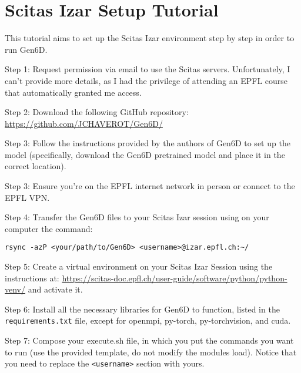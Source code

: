 \chapter{Scitas Izar Setup Tutorial}\label{chapter:scitas}

This tutorial aims to set up the Scitas Izar environment step by step in order to run Gen6D.

\bigskip

\noindent Step 1: Request permission via email to use the Scitas servers. Unfortunately, I can't provide more details, as I had the privilege of attending an EPFL course that automatically granted me access.

\bigskip


\noindent Step 2: Download the following GitHub repository: \\ \url{https://github.com/JCHAVEROT/Gen6D/}

\bigskip


\noindent Step 3: Follow the instructions provided by the authors of Gen6D to set up the model (specifically, download the Gen6D pretrained model and place it in the correct location).

\bigskip


\noindent Step 3: Ensure you're on the EPFL internet network in person or connect to the EPFL VPN.

\bigskip


\noindent Step 4: Transfer the Gen6D files to your Scitas Izar session using on your computer the command:
{ \captionsetup{labelformat=empty,labelsep=none}
\begin{lstlisting}[style=bashstyle, caption=\null]
rsync -azP <your/path/to/Gen6D> <username>@izar.epfl.ch:~/
\end{lstlisting}
}

\vspace{-0.4cm}

\noindent Step 5: Create a virtual environment on your Scitas Izar Session using the instructions at: \url{https://scitas-doc.epfl.ch/user-guide/software/python/python-venv/}  and activate it.

\bigskip


\noindent Step 6: Install all the necessary libraries for Gen6D to function, listed in the \texttt{requirements.txt} file, except for openmpi, py-torch, py-torchvision, and cuda.

\bigskip


\noindent Step 7: Compose your execute.sh file, in which you put the commands you want to run (use the provided template, do not modify the modules load). Notice that you need to replace the \texttt{<username>} section with yours.

